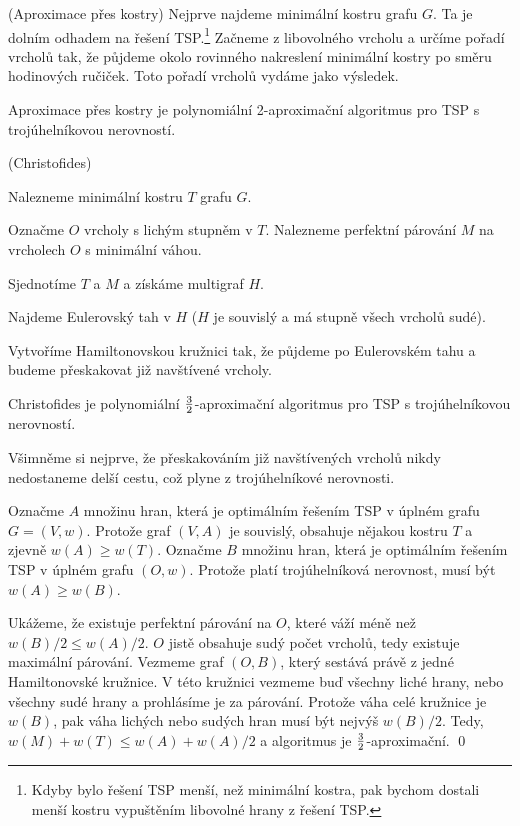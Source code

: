 \alg (Aproximace přes kostry) Nejprve najdeme minimální kostru grafu $G$. Ta je
dolním odhadem na řešení TSP.\footnote{Kdyby bylo řešení TSP menší, než
minimální kostra, pak bychom dostali menší kostru vypuštěním libovolné hrany z
řešení TSP.} Začneme z libovolného vrcholu a určíme pořadí vrcholů tak, že
půjdeme okolo rovinného nakreslení minimální kostry po směru hodinových ručiček.
Toto pořadí vrcholů vydáme jako výsledek.

\vt Aproximace přes kostry je polynomiální 2-aproximační algoritmus pro TSP s
trojúhelníkovou nerovností.

\alg (Christofides)
\begin{enumerate*}
\item Nalezneme minimální kostru $T$ grafu $G$.
\item Označme $O$ vrcholy s lichým stupněm v $T$. Nalezneme perfektní párování
$M$ na vrcholech $O$ s minimální váhou.
\item Sjednotíme $T$ a $M$ a získáme multigraf $H$.
\item Najdeme Eulerovský tah v $H$ ($H$ je souvislý a má stupně všech vrcholů sudé).
\item Vytvoříme Hamiltonovskou kružnici tak, že půjdeme po Eulerovském tahu a
budeme přeskakovat již navštívené vrcholy.
\end{enumerate*}

\vt Christofides je polynomiální $3\over 2$-aproximační algoritmus pro TSP s
trojúhelníkovou nerovností.

\dk Všimněme si nejprve, že přeskakováním již navštívených vrcholů nikdy
nedostaneme delší cestu, což plyne z trojúhelníkové nerovnosti.

Označme $A$ množinu hran, která je optimálním řešením TSP v úplném grafu $G =
(V,w)$. Protože graf $(V,A)$ je souvislý, obsahuje nějakou kostru $T$ a zjevně
$w(A) \ge w(T)$. Označme $B$ množinu hran, která je optimálním řešením TSP v
úplném grafu $(O,w)$. Protože platí trojúhelníková nerovnost, musí být $w(A) \ge
w(B)$.

Ukážeme, že existuje perfektní párování na $O$, které váží méně než $w(B)/2 \le
w(A)/2$. $O$ jistě obsahuje sudý počet vrcholů, tedy existuje maximální
párování. Vezmeme graf $(O,B)$, který sestává právě z jedné Hamiltonovské
kružnice. V této kružnici vezmeme buď všechny liché hrany, nebo všechny sudé
hrany a prohlásíme je za párování. Protože váha celé kružnice je $w(B)$, pak
váha lichých nebo sudých hran musí být nejvýš $w(B)/2$. Tedy, $w(M) + w(T) \le
w(A) + w(A)/2$ a algoritmus je $3\over 2$-aproximační.
\qed

